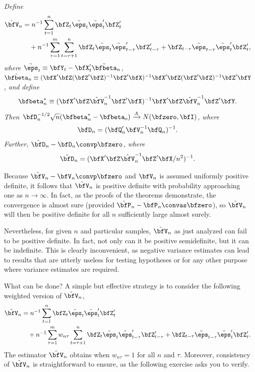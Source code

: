 \begin{exercises}
\begin{enumerate}[label=(\roman*)]
\begin{enumerate}[label=(\alph*)]
  \end{enumerate}
\end{enumerate}
\textit{Define}
\begin{align*}
  \hat{\bfV}_n &= n^{-1}\sum_{t=1}^{n}\bfZ_t\tilde{\eps}_t\tilde{\eps}_t'\bfZ_t' \\
    &\quad + n^{-1}\sum_{\tau=1}^{m}\sum_{t=\tau+1}^{n}\bfZ_t\tilde{\eps}_t\tilde{\eps}_{t-\tau}'\bfZ_{t-\tau}' + \bfZ_{t-\tau}\tilde{\eps}_{t-\tau}\tilde{\eps}_t'\bfZ_t',
\end{align*}
\textit{where $\tilde{\eps}_t \equiv \bfY_t - \bfX_t'\tilde{\bfbeta}_n$, $\tilde{\bfbeta}_n \equiv (\bfX'\bfZ(\bfZ'\bfZ)^{-1}\bfZ'\bfX)^{-1}\bfX'\bfZ(\bfZ'\bfZ)^{-1}\bfZ'\bfY$, and define}
\[
  \bfbeta_n^* \equiv (\bfX'\bfZ\hat{\bfV}_n^{-1}\bfZ'\bfX)^{-1}\bfX'\bfZ\hat{\bfV}_n^{-1}\bfZ'\bfY.
\]
\textit{Then $\bfD_n^{-1/2}\sqrt{n}(\bfbeta_n^* - \bfbeta_o) \xrightarrow{A} N(\bfzero,\bfI)$, where}
\[
  \bfD_n = (\bfQ_n'\bfV_n^{-1}\bfQ_n)^{-1}.
\]
\textit{Further, $\hat{\bfD}_n - \bfD_n \convp \bfzero$, where}
\[
  \hat{\bfD}_n = (\bfX'\bfZ\hat{\bfV}_n^{-1}\bfZ'\bfX/n^2)^{-1}.
\]
\end{exercises}

Because $\hat{\bfV}_n - \bfV_n \convp \bfzero$ and $\bfV_n$ is assumed uniformly positive definite, it follows that $\hat{\bfV}_n$ is positive definite with probability approaching one as $n \to \infty$. In fact, as the proofs of the theorems demonstrate, the convergence is almost sure (provided $\hat{\bfP}_n - \bfP_n \convas \bfzero$), so $\hat{\bfV}_n$ will then be positive definite for all $n$ sufficiently large almost surely.

Nevertheless, for given $n$ and particular samples, $\hat{\bfV}_n$ as just analyzed can fail to be positive definite. In fact, not only can it be positive semidefinite, but it can be indefinite. This is clearly inconvenient, as negative variance estimates can lead to results that are utterly useless for testing hypotheses or for any other purpose where variance estimates are required.

What can be done? A simple but effective strategy is to consider the following weighted version of $\hat{\bfV}_n$,
\begin{align*}
  \tilde{\bfV}_n &= n^{-1}\sum_{t=1}^{n}\bfZ_t\tilde{\eps}_t\tilde{\eps}_t'\bfZ_t' \\
    &\quad + n^{-1}\sum_{\tau=1}^{m}w_{n\tau}\sum_{t=\tau+1}^{n}\bfZ_t\tilde{\eps}_t\tilde{\eps}_{t-\tau}'\bfZ_{t-\tau}' + \bfZ_{t-\tau}\tilde{\eps}_{t-\tau}\tilde{\eps}_t'\bfZ_t'.
\end{align*}
The estimator $\hat{\bfV}_n$ obtains when $w_{n\tau} = 1$ for all $n$ and $\tau$. Moreover, consistency of $\tilde{\bfV}_n$ is straightforward to ensure, as the following exercise asks you to verify.

